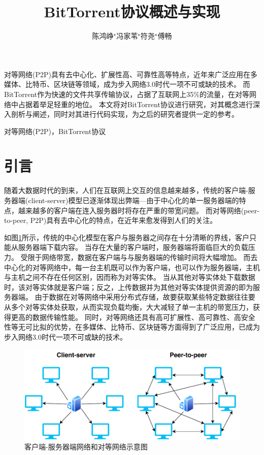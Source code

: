 \documentclass[thesis]{thesis}
\title{BitTorrent协议概述与实现}
\author{陈鸿峥$^\star$\qquad 冯家苇$^\star$\qquad 符尧$^\star$\qquad 傅畅}
\begin{document}
\maketitle

\begin{abstractchinese}
对等网络(P2P)具有去中心化、扩展性高、可靠性高等特点，近年来广泛应用在多媒体、比特币、区块链等领域，成为步入网络3.0时代一项不可或缺的技术。
而BitTorrent作为快速的文件共享传输协议，占据了互联网上35\%的流量，在对等网络中占据着举足轻重的地位。
本文将对BitTorrent协议进行研究，对其概念进行深入剖析与阐述，同时对其进行代码实现，为之后的研究者提供一定的参考。
\end{abstractchinese}

\begin{keywordchinese}
对等网络(P2P)，BitTorrent协议
\end{keywordchinese}


\section{引言}
随着大数据时代的到来，人们在互联网上交互的信息越来越多，传统的客户端-服务器端(client-server)模型已逐渐体现出弊端---由于中心化的单一服务器端的特点，越来越多的客户端在连入服务器时将存在严重的带宽问题。
而对等网络(peer-to-peer, P2P)具有去中心化的特点，在近年来愈发得到人们的关注\cite{wiki_p2p}。

如图\ref{fig:p2p}所示，传统的中心化模型在客户与服务器之间存在十分清晰的界线，客户只能从服务器端下载内容。
当存在大量的客户端时，服务器端将面临巨大的负载压力。
受限于网络带宽，数据在客户端与与服务器端的传输时间将大幅增加。
而去中心化的对等网络中，每一台主机既可以作为客户端，也可以作为服务器端，主机与主机之间不存在任何区别，因而称为对等实体。
当从其他对等实体处下载数据时，该对等实体就是客户端；反之，上传数据并为其他对等实体提供资源的即为服务器端。
由于数据在对等网络中采用分布式存储，故要获取某些特定数据往往要从多个对等实体处获取，从而实现负载均衡，大大减轻了单一主机的带宽压力，获得更高的数据传输性能。
同时，对等网络还具有高可扩展性、高可靠性、高安全性等无可比拟的优势，在多媒体\cite{qqlive}、比特币\cite{bitcoin}、区块链\cite{blockchain}等方面得到了广泛应用，已成为步入网络3.0时代一项不可或缺的技术\cite{web3}。
\begin{figure}[htbp]
\centering
\includegraphics[width=0.6\linewidth]{fig/p2p.pdf}
\caption{客户端-服务器端网络和对等网络示意图}
\label{fig:p2p}
\end{figure}
\end{document}
